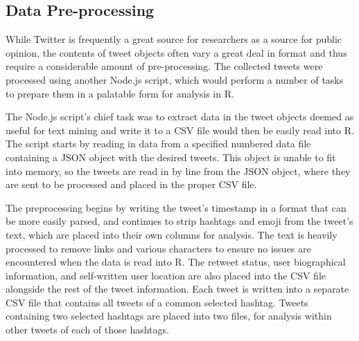 \documentclass[prodmode]{acmsmall} %
\begin{document}
\subsection{Data Pre-processing}
While Twitter is frequently a great source for researchers as a source for
public opinion, the contents of tweet objects often vary a great deal in format
and thus require a considerable amount of pre-processing. The collected tweets
were processed using another Node.js script, which would perform a number of
tasks to prepare them in a palatable form for analysis in R.

The Node.js script's chief task was to extract data in the tweet objects deemed
as useful for text mining and write it to a CSV file would then be easily read
into R. The script starts by reading in data from a specified numbered data file
containing a JSON object with the desired tweets. This object is unable to fit
into memory, so the tweets are read in by line from the JSON object, where they
are sent to be processed and placed in the proper CSV file.

The preprocessing begins by writing the tweet's timestamp in a format that can
be more easily parsed, and continues to strip hashtags and emoji from the
tweet's text, which are placed into their own columns for analysis. The text is
heavily processed to remove links and various characters to ensure no issues are
encountered when the data is read into R. The retweet status, user biographical
information, and self-written user location are also placed into the CSV file
alongside the rest of the tweet information. Each tweet is written into a
separate CSV file that contains all tweets of a common selected hashtag. Tweets
containing two selected hashtags are placed into two files, for analysis within
other tweets of each of those hashtags.

\begin{table}[!t]
\end{table}
\end{document}
